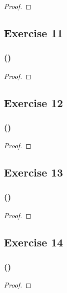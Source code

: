 \documentclass[14pt]{extarticle}
\begin{document}
\begin{proof}

\end{proof}

\subsection{Exercise 11}

\subsubsection{()}

\begin{proof}

\end{proof}

\subsection{Exercise 12}

\subsubsection{()}

\begin{proof}

\end{proof}

\subsection{Exercise 13}

\subsubsection{()}

\begin{proof}

\end{proof}

\subsection{Exercise 14}

\subsubsection{()}

\begin{proof}

\end{proof}
\end{document}
